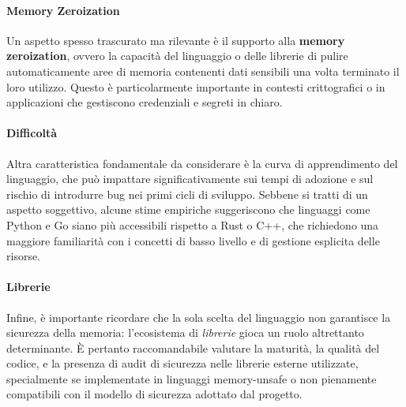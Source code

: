 \paragraph{Memory Zeroization}
Un aspetto spesso trascurato ma rilevante è il supporto alla \textbf{memory
zeroization}, ovvero la capacità del linguaggio o delle librerie di pulire automaticamente
aree di memoria contenenti dati sensibili una volta terminato il loro utilizzo.
Questo è particolarmente importante in contesti crittografici o in applicazioni
che gestiscono credenziali e segreti in chiaro.

\paragraph{Difficoltà}
Altra caratteristica fondamentale da considerare è la curva di apprendimento del
linguaggio, che può impattare significativamente sui tempi di adozione e sul
rischio di introdurre bug nei primi cicli di sviluppo. Sebbene si tratti di un aspetto
soggettivo, alcune stime empiriche\cite{learning_curves} suggeriscono che linguaggi
come Python e Go siano più accessibili rispetto a Rust o C++, che richiedono una
maggiore familiarità con i concetti di basso livello e di gestione esplicita
delle risorse.

\paragraph{Librerie}
Infine, è importante ricordare che la sola scelta del linguaggio non garantisce
la sicurezza della memoria: l'ecosistema di \textit{librerie} gioca un ruolo
altrettanto determinante. È pertanto raccomandabile valutare la maturità, la
qualità del codice, e la presenza di audit di sicurezza nelle librerie esterne utilizzate,
specialmente se implementate in linguaggi memory-unsafe o non pienamente
compatibili con il modello di sicurezza adottato dal progetto.